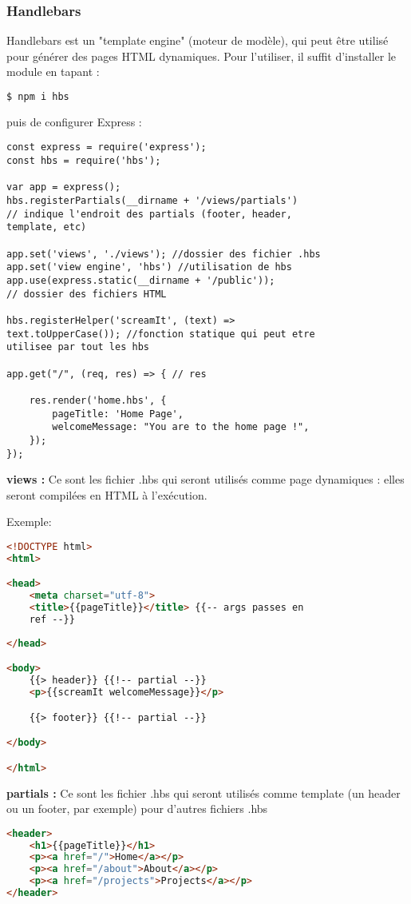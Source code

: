 \documentclass[a4paper,10pt]{article}
\begin{document}
  
\subsubsection{Handlebars}
Handlebars est un "template engine" (moteur de modèle), qui peut être utilisé pour générer des pages HTML dynamiques. Pour l'utiliser, il suffit d'installer le module en tapant :
\begin{lstlisting}[language=bash,frame=single]
    $ npm i hbs  
\end{lstlisting}
puis de configurer Express : 
\begin{lstlisting}[frame=single]
const express = require('express');
const hbs = require('hbs');

var app = express();
hbs.registerPartials(__dirname + '/views/partials') 
// indique l'endroit des partials (footer, header,
template, etc)

app.set('views', './views'); //dossier des fichier .hbs
app.set('view engine', 'hbs') //utilisation de hbs
app.use(express.static(__dirname + '/public'));
// dossier des fichiers HTML

hbs.registerHelper('screamIt', (text) => 
text.toUpperCase()); //fonction statique qui peut etre 
utilisee par tout les hbs

app.get("/", (req, res) => { // res 

    res.render('home.hbs', {
        pageTitle: 'Home Page',
        welcomeMessage: "You are to the home page !",
    });
});
\end{lstlisting}
\textbf{views :} Ce sont les fichier .hbs qui seront utilisés comme page dynamiques : elles  seront compilées en HTML à l'exécution.

Exemple:
\begin{lstlisting}[language=html,frame=single,caption={home.hbs},captionpos=b]
<!DOCTYPE html>
<html>

<head>
    <meta charset="utf-8">
    <title>{{pageTitle}}</title> {{-- args passes en 
    ref --}}
    
</head>

<body>
    {{> header}} {{!-- partial --}}
    <p>{{screamIt welcomeMessage}}</p>

    {{> footer}} {{!-- partial --}}

</body>

</html>
\end{lstlisting}

\textbf{partials :} Ce sont les fichier .hbs qui seront utilisés comme template (un header ou un footer, par exemple) pour d'autres fichiers .hbs
\begin{lstlisting}[language=html,frame=single,caption={header.hbs},captionpos=b]
<header>
    <h1>{{pageTitle}}</h1>
    <p><a href="/">Home</a></p>
    <p><a href="/about">About</a></p>
    <p><a href="/projects">Projects</a></p>
</header>
\end{lstlisting}
    
\end{document}
